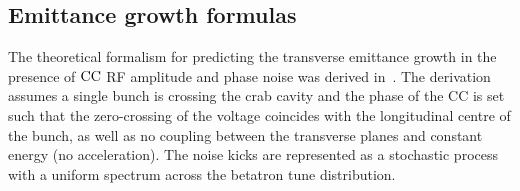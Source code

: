 \subsection{Emittance growth formulas}\label{subsec:CC_emit_growth_theoretical_formulas}
The theoretical formalism for predicting the transverse emittance growth in the presence of ${\mathrm{CC}}$ RF amplitude and phase noise was derived in~\cite{PhysRevSTAB.18.101001}. The derivation assumes a single bunch is crossing the crab cavity and the phase of the CC is set such that the zero-crossing of the voltage coincides with the longitudinal centre of the bunch, as well as no coupling between the transverse planes and constant energy (no acceleration). %
The noise kicks are represented as a stochastic process with a uniform spectrum across the betatron tune distribution.



